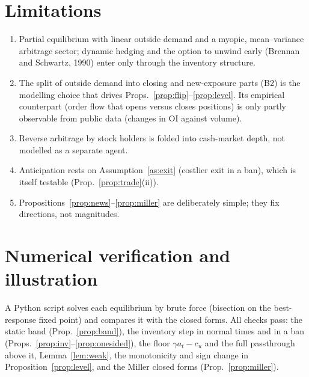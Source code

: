 \documentclass[11pt,a4paper]{article}
\theoremstyle{plain}
\theoremstyle{definition}
\theoremstyle{remark}
\begin{document}
\section{Limitations}
\begin{enumerate}[leftmargin=1.6em,itemsep=1pt]
\item Partial equilibrium with linear outside demand and a myopic, mean--variance arbitrage sector; dynamic hedging and
the option to unwind early (Brennan and Schwartz, 1990) enter only through the inventory structure.
\item The split of outside demand into closing and new-exposure parts (B2) is the modelling choice that drives
Props.~\ref{prop:flip}--\ref{prop:level}. Its empirical counterpart (order flow that opens versus closes positions) is only
partly observable from public data (changes in OI against volume).
\item Reverse arbitrage by stock holders is folded into cash-market depth, not modelled as a separate agent.
\item Anticipation rests on Assumption~\ref{as:exit} (costlier exit in a ban), which is itself testable (Prop.~\ref{prop:trade}(ii)).
\item Propositions~\ref{prop:news}--\ref{prop:miller} are deliberately simple; they fix directions, not magnitudes.
\end{enumerate}

\appendix
\section{Numerical verification and illustration}\label{app:num}
A Python script solves each equilibrium by brute force (bisection on the best-response fixed point) and compares it
with the closed forms. All checks pass: the static band (Prop.~\ref{prop:band}),
the inventory step in normal times and in a ban (Props.~\ref{prop:inv}--\ref{prop:onesided}), the floor
$\gamma a_t-c_u$ and the full passthrough above it, Lemma~\ref{lem:weak}, the monotonicity and sign change in
Proposition~\ref{prop:level}, and the Miller closed forms (Prop.~\ref{prop:miller}).
\end{document}
